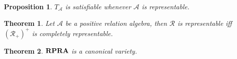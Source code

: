 \documentclass[a4paper]{article}
\theoremstyle{defin}
\theoremstyle{theorem}
\newtheorem{theorem}{Theorem}
\theoremstyle{claim}
\theoremstyle{prop}
\newtheorem{prop}{Proposition}
\theoremstyle{lemma}
\theoremstyle{fact}
\theoremstyle{ex}
\theoremstyle{col}
\begin{document}
\begin{prop}
$T_{\mathcal{A}}$ is satisfiable whenever $\mathcal{A}$ is representable.
\end{prop}

\begin{theorem}
Let $\mathcal{A}$ be a positive relation algebra, then $\mathcal{R}$ is representable iff $(\mathcal{R}_{+})^{+}$ is completely representable.
\end{theorem}

\begin{theorem}
${\bf RPRA}$ is a canonical variety.
\end{theorem}



\end{document}
